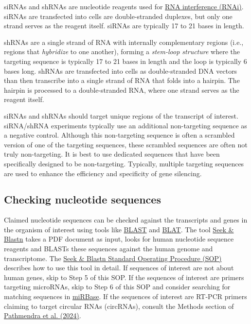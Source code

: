 \documentclass[letterpaper, 12pt]{article}
\begin{document}
siRNAs and shRNAs are nucleotide reagents used for \href{https://en.wikipedia.org/wiki/RNA_interference}{RNA interference (RNAi)}. siRNAs are transfected into cells are double-stranded duplexes, but only one strand serves as the reagent itself. siRNAs are typically 17 to 21 bases in length. 

shRNAs are a single strand of RNA with internally complementary regions (i.e., regions that \emph{hybridize} to one another), forming a \emph{stem-loop structure} where the targeting sequence is typically 17 to 21 bases in length and the loop is typically 6 bases long. shRNAs are transfected into cells as double-stranded DNA vectors than then transcribe into a single strand of RNA that folds into a hairpin. The hairpin is processed to a double-stranded RNA, where one strand serves as the reagent itself.

siRNAs and shRNAs should target unique regions of the transcript of interest. siRNA/shRNA experiments typically use an additional non-targeting sequence as a negative control. Although this non-targeting sequence is often a scrambled version of one of the targeting sequences, these scrambled sequences are often not truly non-targeting. It is best to use dedicated sequences that have been specifically designed to be non-targeting. Typically, multiple targeting sequences are used to enhance the efficiency and specificity of gene silencing.

\subsection*{Checking nucleotide sequences}

Claimed nucleotide sequences can be checked against the transcripts and genes in the organism of interest using tools like \href{https://blast.ncbi.nlm.nih.gov/Blast.cgi?PROGRAM=blastn}{BLAST} and \href{https://genome.ucsc.edu/cgi-bin/hgBlat}{BLAT}. The tool \href{https://scigendetection.imag.fr/TPD52/Vb/}{Seek \& Blastn} takes a PDF document as input, looks for human nucleotide sequence reagents and BLASTs these sequences against the human genome and transcriptome. The \href{https://dx.doi.org/10.17504/protocols.io.bjhpkj5n}{Seek \& Blastn Standard Operating Procedure (SOP)} describes how to use this tool in detail. If sequences of interest are not about human genes, skip to Step 5 of this SOP. If the sequences of interest are primers targeting microRNAs, skip to Step 6 of this SOP and consider searching for matching sequences in \href{https://www.mirbase.org/}{miRBase}. If the sequences of interest are RT-PCR primers claiming to target circular RNAs (circRNAs), consult the Methods section of \href{https://doi.org/10.1007/s00210-023-02846-2}{Pathmendra et al. (2024)}.
\end{document}
